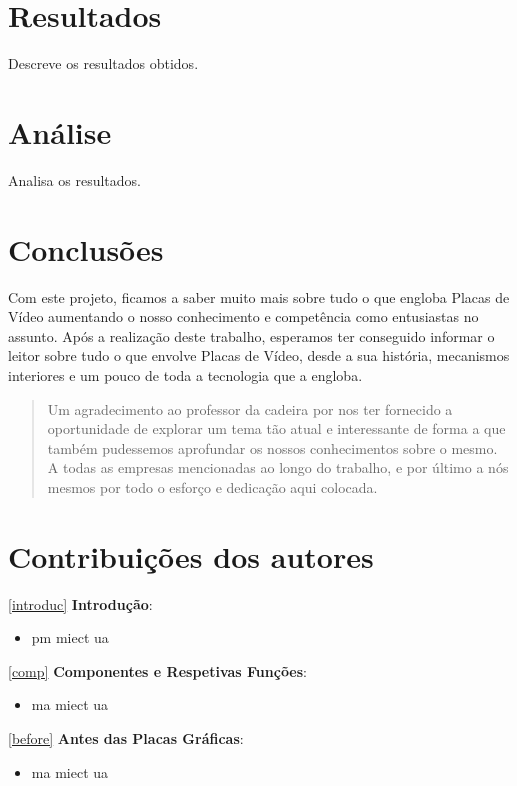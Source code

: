 \documentclass{report}
\begin{document}
\chapter{Resultados}
\label{chap.resultados}
Descreve os resultados obtidos.

\chapter{Análise}
\label{chap.analise}
Analisa os resultados.

\chapter{Conclusões}
\label{conclusao}
Com este projeto, ficamos a saber muito mais sobre tudo o que engloba Placas de Vídeo aumentando o nosso conhecimento e competência como entusiastas no assunto. \newline
Após a realização deste trabalho, esperamos ter conseguido informar o leitor sobre tudo o que envolve Placas de Vídeo, desde a sua história, mecanismos interiores e um pouco de toda a tecnologia que a engloba.

\renewcommand{\abstractname}{Agradecimentos}
\begin{abstract}
Um agradecimento ao professor da cadeira por nos ter fornecido a oportunidade de explorar um tema tão atual e interessante de forma a que também pudessemos aprofundar os nossos conhecimentos sobre o mesmo. A todas as empresas mencionadas ao longo do trabalho, e por último a nós mesmos por todo o esforço e dedicação aqui colocada.
\end{abstract}

\chapter*{Contribuições dos autores}

\ref{introduc} \textbf{Introdução}:
\begin{itemize}
    \item \ac{pm} \ac{miect} \ac{ua}
\end{itemize}

\ref{comp} \textbf{Componentes e Respetivas Funções}:
\begin{itemize}
    \item \ac{ma} \ac{miect} \ac{ua}
\end{itemize}

\ref{before} \textbf{Antes das Placas Gráficas}:
\begin{itemize}
    \item \ac{ma} \ac{miect} \ac{ua}
\end{itemize}
\end{document}
